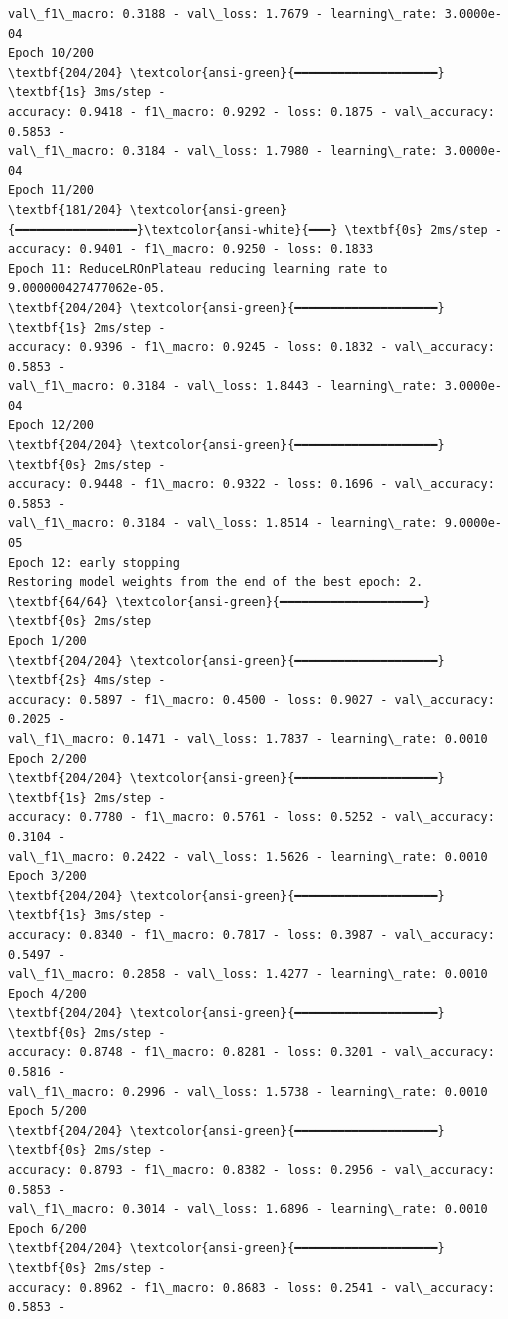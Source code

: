 \documentclass[11pt]{article}
\begin{document}
\begin{Verbatim}[commandchars=\\\{\}]
val\_f1\_macro: 0.3188 - val\_loss: 1.7679 - learning\_rate: 3.0000e-04
Epoch 10/200
\textbf{204/204} \textcolor{ansi-green}{━━━━━━━━━━━━━━━━━━━━} \textbf{1s} 3ms/step -
accuracy: 0.9418 - f1\_macro: 0.9292 - loss: 0.1875 - val\_accuracy: 0.5853 -
val\_f1\_macro: 0.3184 - val\_loss: 1.7980 - learning\_rate: 3.0000e-04
Epoch 11/200
\textbf{181/204} \textcolor{ansi-green}{━━━━━━━━━━━━━━━━━}\textcolor{ansi-white}{━━━} \textbf{0s} 2ms/step -
accuracy: 0.9401 - f1\_macro: 0.9250 - loss: 0.1833
Epoch 11: ReduceLROnPlateau reducing learning rate to 9.000000427477062e-05.
\textbf{204/204} \textcolor{ansi-green}{━━━━━━━━━━━━━━━━━━━━} \textbf{1s} 2ms/step -
accuracy: 0.9396 - f1\_macro: 0.9245 - loss: 0.1832 - val\_accuracy: 0.5853 -
val\_f1\_macro: 0.3184 - val\_loss: 1.8443 - learning\_rate: 3.0000e-04
Epoch 12/200
\textbf{204/204} \textcolor{ansi-green}{━━━━━━━━━━━━━━━━━━━━} \textbf{0s} 2ms/step -
accuracy: 0.9448 - f1\_macro: 0.9322 - loss: 0.1696 - val\_accuracy: 0.5853 -
val\_f1\_macro: 0.3184 - val\_loss: 1.8514 - learning\_rate: 9.0000e-05
Epoch 12: early stopping
Restoring model weights from the end of the best epoch: 2.
\textbf{64/64} \textcolor{ansi-green}{━━━━━━━━━━━━━━━━━━━━} \textbf{0s} 2ms/step
Epoch 1/200
\textbf{204/204} \textcolor{ansi-green}{━━━━━━━━━━━━━━━━━━━━} \textbf{2s} 4ms/step -
accuracy: 0.5897 - f1\_macro: 0.4500 - loss: 0.9027 - val\_accuracy: 0.2025 -
val\_f1\_macro: 0.1471 - val\_loss: 1.7837 - learning\_rate: 0.0010
Epoch 2/200
\textbf{204/204} \textcolor{ansi-green}{━━━━━━━━━━━━━━━━━━━━} \textbf{1s} 2ms/step -
accuracy: 0.7780 - f1\_macro: 0.5761 - loss: 0.5252 - val\_accuracy: 0.3104 -
val\_f1\_macro: 0.2422 - val\_loss: 1.5626 - learning\_rate: 0.0010
Epoch 3/200
\textbf{204/204} \textcolor{ansi-green}{━━━━━━━━━━━━━━━━━━━━} \textbf{1s} 3ms/step -
accuracy: 0.8340 - f1\_macro: 0.7817 - loss: 0.3987 - val\_accuracy: 0.5497 -
val\_f1\_macro: 0.2858 - val\_loss: 1.4277 - learning\_rate: 0.0010
Epoch 4/200
\textbf{204/204} \textcolor{ansi-green}{━━━━━━━━━━━━━━━━━━━━} \textbf{0s} 2ms/step -
accuracy: 0.8748 - f1\_macro: 0.8281 - loss: 0.3201 - val\_accuracy: 0.5816 -
val\_f1\_macro: 0.2996 - val\_loss: 1.5738 - learning\_rate: 0.0010
Epoch 5/200
\textbf{204/204} \textcolor{ansi-green}{━━━━━━━━━━━━━━━━━━━━} \textbf{0s} 2ms/step -
accuracy: 0.8793 - f1\_macro: 0.8382 - loss: 0.2956 - val\_accuracy: 0.5853 -
val\_f1\_macro: 0.3014 - val\_loss: 1.6896 - learning\_rate: 0.0010
Epoch 6/200
\textbf{204/204} \textcolor{ansi-green}{━━━━━━━━━━━━━━━━━━━━} \textbf{0s} 2ms/step -
accuracy: 0.8962 - f1\_macro: 0.8683 - loss: 0.2541 - val\_accuracy: 0.5853 -

\end{Verbatim}
\end{document}
